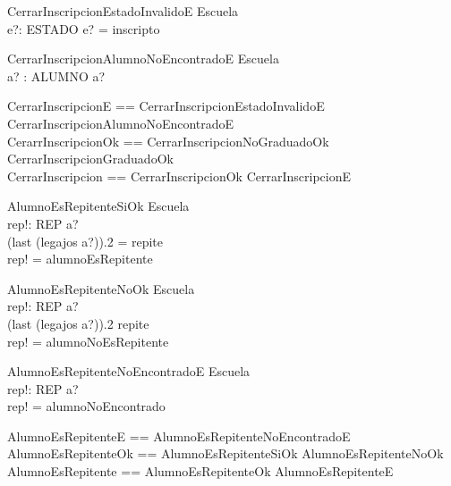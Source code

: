 \documentclass{article}
\begin{document}
  \begin{schema}{CerrarInscripcionEstadoInvalidoE}
    \Xi Escuela \\
    e?: ESTADO
    \where
    e? = inscripto
  \end{schema}

  \begin{schema}{CerrarInscripcionAlumnoNoEncontradoE}
    \Xi Escuela \\
    a? : ALUMNO
    \where
    a? \notin {}
  \end{schema}

  \begin{zed}
    CerrarInscripcionE == CerrarInscripcionEstadoInvalidoE \lor CerrarInscripcionAlumnoNoEncontradoE \\
    CerarrInscripcionOk == CerrarInscripcionNoGraduadoOk \lor CerrarInscripcionGraduadoOk \\
    CerrarInscripcion == CerrarInscripcionOk \lor CerrarInscripcionE
  \end{zed}

  \begin{schema}{AlumnoEsRepitenteSiOk}
    \Xi Escuela \\
    rep!: REP
    \where
    a? \in {} \\
    (last \; (legajos \; a?)).2 = repite \\
    rep! = alumnoEsRepitente
  \end{schema}

  \begin{schema}{AlumnoEsRepitenteNoOk}
    \Xi Escuela \\
    rep!: REP
    \where
    a? \in {} \\
    (last \; (legajos \; a?)).2 \neq repite \\
    rep! = alumnoNoEsRepitente
  \end{schema}

  \begin{schema}{AlumnoEsRepitenteNoEncontradoE}
    \Xi Escuela \\
    rep!: REP
    \where
    a? \notin {} \\
    rep! = alumnoNoEncontrado
  \end{schema}

  \begin{zed}
    AlumnoEsRepitenteE == AlumnoEsRepitenteNoEncontradoE \\
    AlumnoEsRepitenteOk == AlumnoEsRepitenteSiOk \lor AlumnoEsRepitenteNoOk \\
    AlumnoEsRepitente == AlumnoEsRepitenteOk \lor AlumnoEsRepitenteE \\
  \end{zed}
\end{document}
